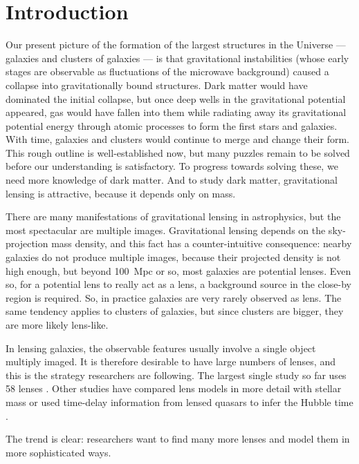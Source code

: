 \section{Introduction}

Our present picture of the formation of the largest structures in the
Universe --- galaxies and clusters of galaxies --- is that
gravitational instabilities (whose early stages are observable as
fluctuations of the microwave background) caused a collapse into
gravitationally bound structures.  Dark matter would have dominated
the initial collapse, but once deep wells in the gravitational
potential appeared, gas would have fallen into them while radiating
away its gravitational potential energy through atomic processes to
form the first stars and galaxies.  With time, galaxies and clusters
would continue to merge and change their form.  This rough outline is
well-established now, but many puzzles remain to be solved before our
understanding is satisfactory.  To progress towards solving these, we
need more knowledge of dark matter.  And to study dark matter,
gravitational lensing is attractive, because it depends only on mass.

There are many manifestations of gravitational lensing in astrophysics,
but the most spectacular are multiple images.  Gravitational lensing
depends on the sky-projection mass density, and this fact has a
counter-intuitive consequence: nearby galaxies do not produce multiple
images, because their projected density is not high enough, but beyond
100~Mpc or so, most galaxies are potential lenses.  Even so, for a
potential lens to really act as a lens, a background source in the close-by
region is required.  So, in practice galaxies are very rarely observed
as lens.  The same tendency applies to clusters of galaxies, but since
clusters are bigger, they are more likely lens-like.

In lensing galaxies, the observable features usually involve a single
object multiply imaged.  It is therefore desirable to have large
numbers of lenses, and this is the strategy researchers are following.  The
largest single study so far uses 58 lenses \citep{2009ApJ...703L..51K}.
Other studies have compared lens models in more detail with stellar
mass \citep{2011ApJ...740...97L} or used time-delay information from
lensed quasars to infer the Hubble time
\citep{2008ApJ...679...17C,2010ApJ...712.1378P}.

The trend is clear: researchers want to find many more lenses and
model them in more sophisticated ways.

